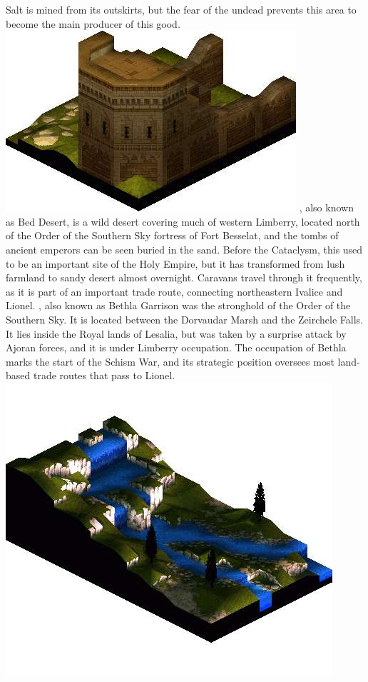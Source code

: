 Salt is mined from its outskirts, but the fear of the undead prevents this area to become the main producer of this good.
%
\vfill
\includegraphics[width=\columnwidth]{./art/worldbook/bethla.jpg}
\vfill
%
, also known as Bed Desert, is a wild desert covering much of western Limberry, located north of the Order of the Southern Sky fortress of Fort Besselat, and the tombs of ancient emperors can be seen buried in the sand. 
Before the Cataclysm, this used to be an important site of the Holy Empire, but it has transformed from lush farmland to sandy desert almost overnight. 
Caravans travel through it frequently, as it is part of an important trade route, connecting northeastern Ivalice and Lionel.
, also known as Bethla Garrison was the stronghold of the Order of the Southern Sky.
It is located between the Dorvaudar Marsh and the Zeirchele Falls. 
It lies inside the Royal lands of Lesalia, but was taken by a surprise attack by Ajoran forces, and it is under Limberry occupation.
The occupation of Bethla marks the start of the Schism War, and its strategic position oversees most land-based trade routes that pass to Lionel.
%
\vfill
\includegraphics[width=\columnwidth]{./art/worldbook/finath.jpg}
